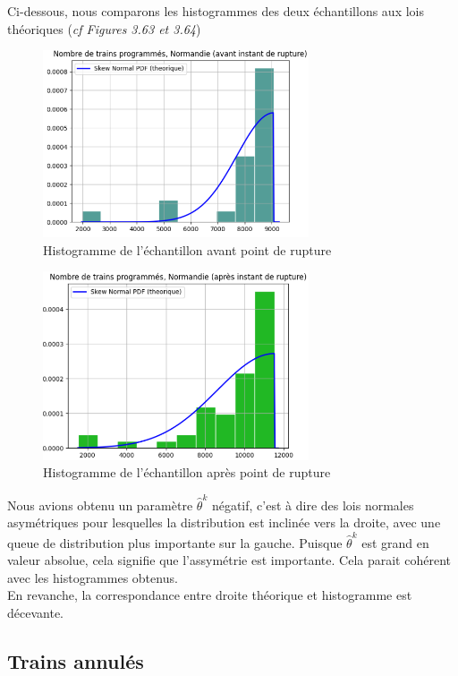 {Ci-dessous, nous comparons les histogrammes des deux échantillons aux lois théoriques (\textit{cf Figures 3.63 et 3.64})

\begin{figure}[H]
  \centering
  \includegraphics[width=0.7\textwidth]{Nor_TP_4.png}
  \caption{Histogramme de l'échantillon avant point de rupture}
\end{figure}

\begin{figure}[H]
  \centering
  \includegraphics[width=0.7\textwidth]{Nor_TP_5.png}
  \caption{Histogramme de l'échantillon après point de rupture}
\end{figure}

Nous avions obtenu un paramètre $\hat{\theta}^k$ négatif, c'est à dire des lois normales asymétriques pour lesquelles la distribution est inclinée vers la droite, avec une queue de distribution plus importante sur la gauche. Puisque $\hat{\theta}^k$ est grand en valeur absolue, cela signifie que l'assymétrie est importante. Cela parait cohérent avec les histogrammes obtenus.\\
En revanche, la correspondance entre droite théorique et histogramme est décevante.

\subsection{Trains annulés}

}
